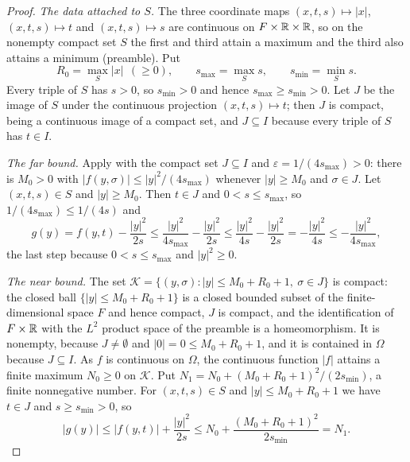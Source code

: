 \begin{proof}
\emph{The data attached to $S$.}
The three coordinate maps $(x,t,s)\mapsto|x|$, $(x,t,s)\mapsto t$ and
$(x,t,s)\mapsto s$ are continuous on $F\times\mathbb{R}\times\mathbb{R}$, so on the nonempty
compact set $S$ the first and third attain a maximum and the third also attains a
minimum (preamble). Put
\[
  R_0=\max_S|x|\ \ (\ge0),\qquad s_{\max}=\max_Ss,\qquad s_{\min}=\min_Ss .
\]
Every triple of $S$ has $s>0$, so $s_{\min}>0$ and hence
$s_{\max}\ge s_{\min}>0$. Let $J$ be the image of $S$ under the continuous
projection $(x,t,s)\mapsto t$; then $J$ is compact, being a continuous image of a
compact set, and $J\subseteq I$ because every triple of $S$ has $t\in I$.

\emph{The far bound.}
Apply  with the compact set $J\subseteq I$ and
$\varepsilon=1/(4s_{\max})>0$: there is $M_0>0$ with
$|f(y,\sigma)|\le|y|^2/(4s_{\max})$ whenever $|y|\ge M_0$ and $\sigma\in J$. Let
$(x,t,s)\in S$ and $|y|\ge M_0$. Then $t\in J$ and $0<s\le s_{\max}$, so
$1/(4s_{\max})\le1/(4s)$ and
\begin{equation}\label{eq:besl-gfar}
  g(y)=f(y,t)-\frac{|y|^2}{2s}
   \le\frac{|y|^2}{4s_{\max}}-\frac{|y|^2}{2s}
   \le\frac{|y|^2}{4s}-\frac{|y|^2}{2s}
   =-\frac{|y|^2}{4s}
   \le-\frac{|y|^2}{4s_{\max}} ,
\end{equation}
the last step because $0<s\le s_{\max}$ and $|y|^2\ge0$.

\emph{The near bound.}
The set $\mathcal K=\{(y,\sigma):|y|\le M_0+R_0+1,\ \sigma\in J\}$ is compact:
the closed ball $\{|y|\le M_0+R_0+1\}$ is a closed bounded subset of the
finite-dimensional space $F$ and hence compact, $J$ is compact, and the
identification of $F\times\mathbb{R}$ with the $L^2$ product space of the preamble is a
homeomorphism. It is nonempty, because $J\ne\emptyset$ and $|0|=0\le M_0+R_0+1$,
and it is contained in $\Omega$ because $J\subseteq I$. As $f$ is continuous on
$\Omega$, the continuous function $|f|$ attains a finite maximum $N_0\ge0$ on
$\mathcal K$. Put $N_1=N_0+(M_0+R_0+1)^2/(2s_{\min})$, a finite nonnegative
number. For $(x,t,s)\in S$ and $|y|\le M_0+R_0+1$ we have $t\in J$ and
$s\ge s_{\min}>0$, so
\begin{equation}\label{eq:besl-gnear}
  |g(y)|\le|f(y,t)|+\frac{|y|^2}{2s}
   \le N_0+\frac{(M_0+R_0+1)^2}{2s_{\min}}=N_1 .
\end{equation}


\end{proof}
